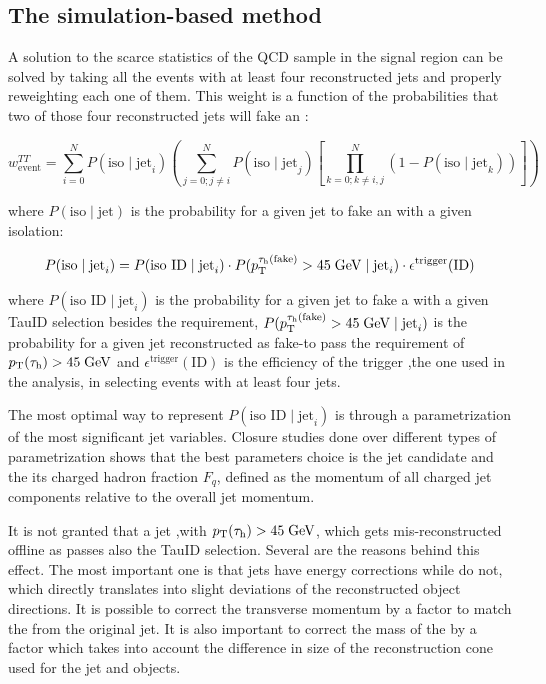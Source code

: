 \subsection{The simulation-based method}
\label{dihad:subsec:eventweight}
\FloatBarrier

A solution to the scarce statistics of the QCD sample in the signal region can be solved by taking all the events with at least four reconstructed jets and properly reweighting each one of them. This weight is a function of the probabilities that two of those four reconstructed jets will fake an \hadtau:

\begin{equation}
w^{TT}_{\text{event}} = \sum_{i=0}^{N}P(\text{iso}\mid \text{jet}_{i})\left(\sum_{j=0; j\neq i}^{N}P(\text{iso}\mid \text{jet}_{j})\left[\prod_{k=0; k\neq i,j}^{N}(1-P(\text{iso}\mid \text{jet}_{k}))\right]\right)
\end{equation}

where $P(\text{iso}\mid \text{jet})$ is the probability for a given jet to fake an \hadtau with a given isolation:

\begin{equation}
P(\text{iso}\mid \text{jet}_{i}) = P(\text{iso ID}\mid \text{jet}_{i}) \cdot P(p_{\text{T}}^{\tau_{\text{h}}(\text{fake})} > 45\;\text{Ge}\kern-0.06667em\text{V}\mid \text{jet}_{i}) \cdot  \epsilon^{\text{trigger}}(\text{ID})
\end{equation}

where $P(\text{iso ID}\mid \text{jet}_{i})$ is the probability for a given jet to fake a \hadtau with a given TauID selection besides the \pt requirement, $P(p_{\text{T}}^{\tau_{\text{h}}(\text{fake})} > 45\;\text{Ge}\kern-0.06667em\text{V}\mid \text{jet}_{i})$ is the probability for a given jet reconstructed as fake-\hadtau to pass the requirement of $p_{\text{T}}(\tau_{\text{h}})> 45\;\text{Ge}\kern-0.06667em\text{V}$ and $\epsilon^{\text{trigger}}(\text{ID})$ is the efficiency of the trigger ,the one used in the analysis, in selecting events with at least four jets.

The most optimal way to represent $P(\text{iso ID}\mid \text{jet}_{i})$ is through a parametrization of the most significant jet variables. Closure studies done over different types of parametrization shows that the best parameters choice is the jet candidate \pt and the its charged hadron fraction $F_{q}$, defined as the momentum of all charged jet components relative to the overall jet momentum.

It is not granted that a jet ,with $p_{\text{T}}(\tau_{\text{h}})> 45\;\text{Ge}\kern-0.06667em\text{V}$, which gets mis-reconstructed offline as \hadtau passes also the TauID \pt selection. Several are the reasons behind this effect. The most important one is that jets have energy corrections while \hadtaufake do not, which directly translates into slight deviations of the reconstructed object directions. It is possible to correct the \hadtau transverse momentum by a factor to match the \pt from the original jet. It is also important to correct the mass of the \hadtaufake by a factor which takes into account the difference in size of the reconstruction cone used for the jet and \hadtau objects.

